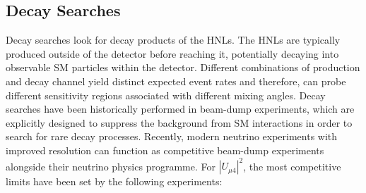 \subsection{Decay Searches}

Decay searches look for decay products of the HNLs.
The HNLs are typically produced outside of the detector before reaching it, potentially decaying into observable SM particles within the detector.
Different combinations of production and decay channel yield distinct expected event rates and therefore, can probe different sensitivity regions associated with different mixing angles.
Decay searches have been historically performed in beam-dump experiments, which are explicitly designed to suppress the background from SM interactions in order to search for rare decay processes.
Recently, modern neutrino experiments with improved resolution can function as competitive beam-dump experiments alongside their neutrino physics programme.
For $|U_{\mu4}|^{2}$, the most competitive limits have been set by the following experiments:

